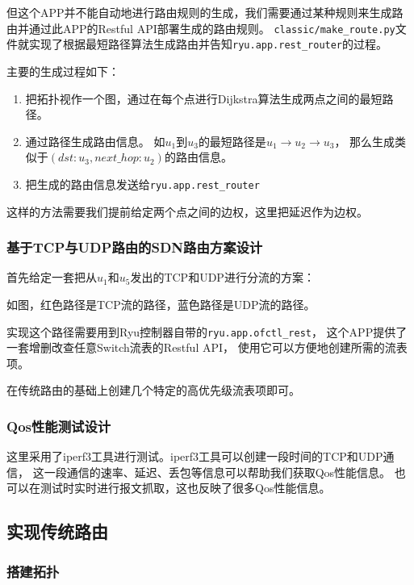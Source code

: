 但这个APP并不能自动地进行路由规则的生成，我们需要通过某种规则来生成路由并通过此APP的Restful API部署生成的路由规则。
\texttt{classic/make\_route.py}文件就实现了根据最短路径算法生成路由并告知\texttt{ryu.app.rest\_router}的过程。

主要的生成过程如下：

\begin{enumerate}
	\item 把拓扑视作一个图，通过在每个点进行Dijkstra算法生成两点之间的最短路径。
	\item 通过路径生成路由信息。
如$u_1$到$u_3$的最短路径是$u_1 \rightarrow u_2 \rightarrow u_3$，
那么生成类似于$(dst:u_3, next\_hop:u_2)$的路由信息。
	\item 把生成的路由信息发送给\texttt{ryu.app.rest\_router}
\end{enumerate}

这样的方法需要我们提前给定两个点之间的边权，这里把延迟作为边权。

\subsubsection{基于TCP与UDP路由的SDN路由方案设计}

首先给定一套把从$u_1$和$u_5$发出的TCP和UDP进行分流的方案：



如图，红色路径是TCP流的路径，蓝色路径是UDP流的路径。

实现这个路径需要用到Ryu控制器自带的\texttt{ryu.app.ofctl\_rest}，
这个APP提供了一套增删改查任意Switch流表的Restful API，
使用它可以方便地创建所需的流表项。

在传统路由的基础上创建几个特定的高优先级流表项即可。

\subsubsection{Qos性能测试设计}

这里采用了iperf3工具进行测试。iperf3工具可以创建一段时间的TCP和UDP通信，
这一段通信的速率、延迟、丢包等信息可以帮助我们获取Qos性能信息。
也可以在测试时实时进行报文抓取，这也反映了很多Qos性能信息。

\subsection{实现传统路由}

\subsubsection{搭建拓扑}

